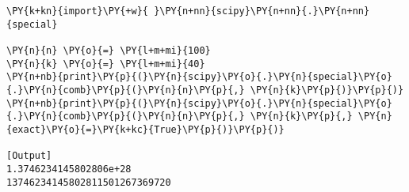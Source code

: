 \begin{Verbatim}[label=\makebox{\href{https://github.com/unipi-physics-labs/statnotes/tree/main/snippy/scipy.special.comb.py}{https://github.com/.../scipy.special.comb.py}},commandchars=\\\{\}]
\PY{k+kn}{import}\PY{+w}{ }\PY{n+nn}{scipy}\PY{n+nn}{.}\PY{n+nn}{special}

\PY{n}{n} \PY{o}{=} \PY{l+m+mi}{100}
\PY{n}{k} \PY{o}{=} \PY{l+m+mi}{40}
\PY{n+nb}{print}\PY{p}{(}\PY{n}{scipy}\PY{o}{.}\PY{n}{special}\PY{o}{.}\PY{n}{comb}\PY{p}{(}\PY{n}{n}\PY{p}{,} \PY{n}{k}\PY{p}{)}\PY{p}{)}
\PY{n+nb}{print}\PY{p}{(}\PY{n}{scipy}\PY{o}{.}\PY{n}{special}\PY{o}{.}\PY{n}{comb}\PY{p}{(}\PY{n}{n}\PY{p}{,} \PY{n}{k}\PY{p}{,} \PY{n}{exact}\PY{o}{=}\PY{k+kc}{True}\PY{p}{)}\PY{p}{)}

[Output]
1.3746234145802806e+28
13746234145802811501267369720
\end{Verbatim}
